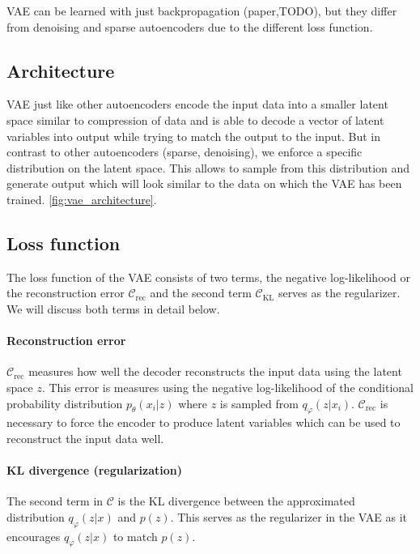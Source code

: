 \documentclass[twoside,11pt,a4paper]{article}
\theoremstyle{break}
\begin{document}
VAE can be learned with just backpropagation (paper,TODO), but they differ from denoising and sparse autoencoders due to the different loss function.



\subsection{Architecture}
\label{sub:vae_architecture}
VAE just like other autoencoders encode the input data into a smaller latent space similar to compression of data and is able to decode a vector of latent variables into output while trying to match the output to the input.
But in contrast to other autoencoders (sparse, denoising), we enforce a specific distribution on the latent space.
This allows to sample from this distribution and generate output which will look similar to the data on which the VAE has been trained.
\ref{fig:vae_architecture}.

\subsection{Loss function}
The loss function of the VAE consists of two terms, the negative log-likelihood or the reconstruction error $\mathcal{C}_{\mathrm{rec}}$ and the second term $\mathcal{C}_{\mathrm{KL}}$ serves as the regularizer.
We will discuss both terms in detail below.


\paragraph{Reconstruction error}
$\mathcal{C}_{\mathrm{rec}}$ measures how well the decoder reconstructs the input data using the latent space $z$.
This error is measures using the negative log-likelihood of the conditional probability distribution $p_\theta(x_i|z)$ where $z$ is sampled from $q_\varphi(z | x_i)$.
$\mathcal{C}_{\mathrm{rec}}$ is necessary to force the encoder to produce latent variables which can be used to reconstruct the input data well.


\paragraph{KL divergence (regularization)}
The second term in $\mathcal{C}$ is the KL divergence between the approximated distribution $q_\varphi(z|x)$ and $p(z)$. This serves as the regularizer in the VAE as it encourages $q_\varphi(z|x)$ to match $p(z)$.\\
\end{document}
